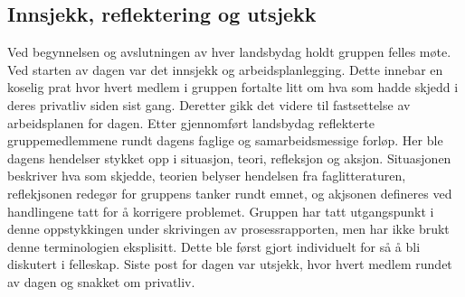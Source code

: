 \subsection{Innsjekk, reflektering og utsjekk}

Ved begynnelsen og avslutningen av hver landsbydag holdt gruppen felles møte.
Ved starten av dagen var det innsjekk og arbeidsplanlegging.
Dette innebar en koselig prat hvor hvert medlem i gruppen fortalte litt om hva som hadde skjedd i deres privatliv siden sist gang.
Deretter gikk det videre til fastsettelse av arbeidsplanen for dagen.
Etter gjennomført landsbydag reflekterte gruppemedlemmene rundt dagens faglige og samarbeidsmessige forløp.
Her ble dagens hendelser stykket opp i situasjon, teori, refleksjon og aksjon. Situasjonen beskriver hva som skjedde, teorien belyser hendelsen fra faglitteraturen, reflekjsonen redegør for gruppens tanker rundt emnet, og akjsonen defineres ved handlingene tatt for å korrigere problemet.  
Gruppen har tatt utgangspunkt i denne oppstykkingen under skrivingen av prosessrapporten, men har ikke brukt denne terminologien eksplisitt. 
Dette ble først gjort individuelt for så å bli diskutert i felleskap.
Siste post for dagen var utsjekk, hvor hvert medlem rundet av dagen og snakket om privatliv.